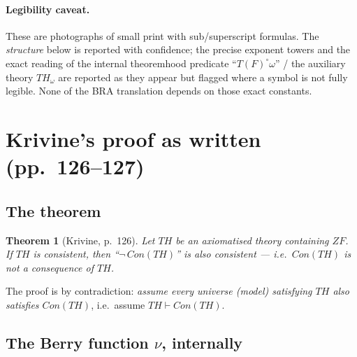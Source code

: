 \documentclass[11pt]{article}
\theoremstyle{plain}
\newtheorem{theorem}{Theorem}[section]
\theoremstyle{definition}
\theoremstyle{remark}
\newcommand{\Con}{\mathit{Con}}
\newcommand{\Thy}{\mathit{TH}}
\newcommand{\Thyo}{\mathit{TH}_\omega}
\begin{document}
\paragraph{Legibility caveat.}  These are photographs of small print
with sub/superscript formulas.  The \emph{structure} below is reported
with confidence; the precise exponent towers and the exact reading of
the internal theoremhood predicate ``$T(F)^{\circ}\omega$'' / the
auxiliary theory $\Thyo$ are reported as they appear but flagged where a
symbol is not fully legible.  None of the BRA translation depends on
those exact constants.

\section{Krivine's proof as written (pp.~126--127)}

\subsection{The theorem}

\begin{theorem}[Krivine, p.~126]
Let $\Thy$ be an axiomatised theory containing $ZF$.  If $\Thy$ is
consistent, then ``$\neg\,\Con(\Thy)$'' is also consistent --- i.e.\
$\Con(\Thy)$ is not a consequence of $\Thy$.
\end{theorem}

The proof is by contradiction: \emph{assume every universe (model)
satisfying $\Thy$ also satisfies $\Con(\Thy)$}, i.e.\ assume
$\Thy\vdash\Con(\Thy)$.

\subsection{The Berry function $\nu$, internally}
\end{document}
